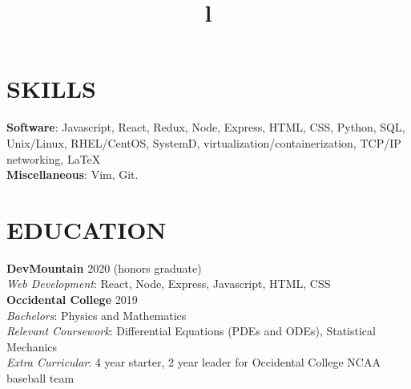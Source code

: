 \documentclass[margin]{res}
\begin{document}
\begin{resume}

\section{SKILLS}

\textbf{Software}: Javascript, React, Redux, Node, Express, HTML, CSS, Python, SQL, Unix/Linux, RHEL/CentOS, SystemD, virtualization/containerization, TCP/IP networking, \LaTeX 
\\
\textbf{Miscellaneous}: Vim, Git.


\section{EDUCATION}
\textbf{DevMountain} 2020 (honors graduate)\\
{\sl Web Development}: React, Node, Express, Javascript, HTML, CSS\\
\textbf{Occidental College} 2019\\
{\sl Bachelors}: Physics and Mathematics\\
{\sl Relevant Coursework}: Differential Equations (PDEs and ODEs), Statistical Mechanics\\
{\sl Extra Curricular}: 4 year starter, 2 year leader for Occidental College NCAA baseball team


\begin{format}
\title{l}\\
\\
\body\\
\end{format}


\end{resume}
\end{document}
